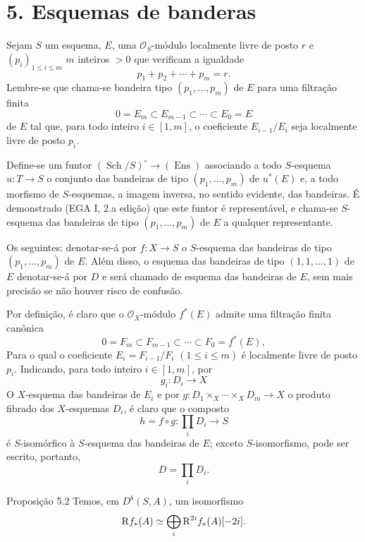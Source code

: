 \section*{5. Esquemas de banderas}

Sejam $S$ um esquema, $E$, uma $\mathcal O_S$-módulo localmente livre de posto $r$ e $(p_i)_{1\le i\le m}$ $m$ inteiros $>0$ que verificam a igualdade
\[
p_1+p_2+\cdots+p_m=r.
\]
Lembre-se que chama-se bandeira tipo $(p_1,\ldots,p_m)$ de $E$ para uma filtração finita
\[
0=E_m\subset E_{m-1}\subset\cdots\subset E_0=E
\]
de $E$ tal que, para todo inteiro $i\in[1,m]$, o coeficiente $E_{i-1}/E_i$ seja localmente livre de posto $p_i$.

Define-se um funtor $(\operatorname{Sch}/S)^\circ\to(\operatorname{Ens})$ associando a todo $S$-esquema $u:T\to S$ o conjunto das bandeiras de tipo $(p_1,\ldots,p_m)$ de $u^*(E)$ e, a todo morfismo de $S$-esquemas, a imagem inversa, no sentido evidente, das bandeiras. É demonstrado (EGA I, 2.a edição) que este funtor é representável, e chama-se $S$-esquema das bandeiras de tipo $(p_1,\ldots,p_m)$ de $E$ a qualquer representante.

Os seguintes: denotar-se-á por $f:X\to S$ o $S$-esquema das bandeiras de tipo $(p_1,\ldots,p_m)$ de $E$. Além disso, o esquema das bandeiras de tipo $(1,1,\ldots,1)$ de $E$ denotar-se-á por $D$ e será chamado de esquema das bandeiras de $E$, sem mais precisão se não houver risco de confusão.

Por definição, é claro que o $\mathcal O_X$-módulo $f^*(E)$ admite uma filtração finita canônica
\[
0=F_m\subset F_{m-1}\subset\cdots\subset F_0=f^*(E),
\]
Para o qual o coeficiente $E_i=F_{i-1}/F_i$ $(1\le i\le m)$ é localmente livre de posto $p_i$. Indicando, para todo inteiro $i\in[1,m]$, por
\[
g_i:D_i\to X
\]
O $X$-esquema das bandeiras de $E_i$ e por $g:D_1\times_X\cdots\times_X D_m\to X$ o produto fibrado dos $X$-esquemas $D_i$, é claro que o composto
\[
h=f\circ g:\prod_iD_i\to S
\tag{5.1}
\]
é $S$-isomórfico à $S$-esquema das bandeiras de $E$; exceto $S$-isomorfismo, pode ser escrito, portanto,
\[
D=\prod_iD_i.
\]

\begin{statement}{Proposição 5.2}
Temos, em $D^b(S,A)$, um isomorfismo
\[
\mathrm{R} f_*(A)\simeq\bigoplus_i \mathrm{R}^{2i}f_*(A)[-2i].
\]
\end{statement}
